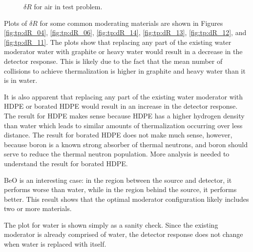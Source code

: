 \begin{figure}
\begin{minipage}{0.495\linewidth}
    \caption{$\delta R$ for air in test problem.}
    \label{fig:tp:dR_01}
  \end{minipage}
\end{figure}

Plots of $\delta R$ for some common moderating materials are shown in Figures \ref{fig:tp:dR_04}, \ref{fig:tp:dR_06}, \ref{fig:tp:dR_14}, \ref{fig:tp:dR_13}, \ref{fig:tp:dR_12}, and \ref{fig:tp:dR_11}.
The plots show that replacing any part of the existing water moderator water with graphite or heavy water would result in a decrease in the detector response.
This is likely due to the fact that the mean number of collisions to achieve thermalization is higher in graphite and heavy water than it is in water.

It is also apparent that replacing any part of the existing water moderator with HDPE or borated HDPE would result in an increase in the detector response.
The result for HDPE makes sense because HDPE has a higher hydrogen density than water which leads to similar amounts of thermalization occurring over less distance.
The result for borated HDPE does not make much sense, however, because boron is a known strong absorber of thermal neutrons, and boron should serve to reduce the thermal neutron population.
More analysis is needed to understand the result for borated HDPE.

BeO is an interesting case: in the region between the source and detector, it performs worse than water, while in the region behind the source, it performs better.
This result shows that the optimal moderator configuration likely includes two or more materials.

The plot for water is shown simply as a sanity check.
Since the existing moderator is already comprised of water, the detector response does not change when water is replaced with itself.

